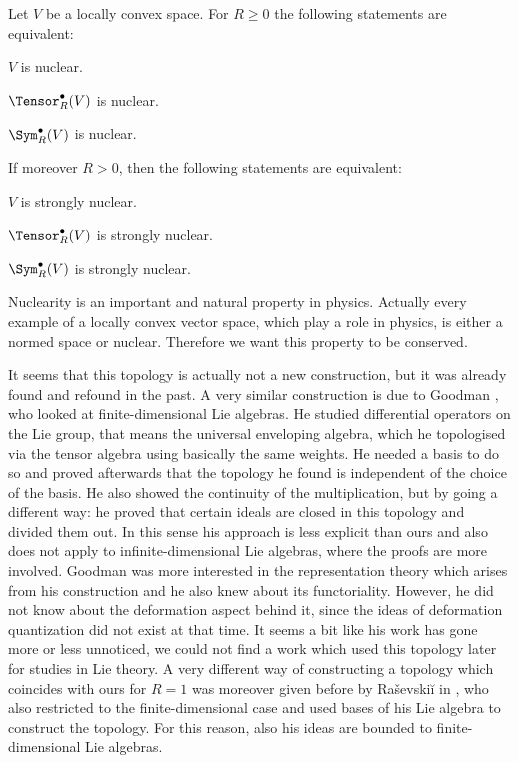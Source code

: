 \begin{proposition}[Nuclearity]
	\label{LCAna:Nuclearity}
	Let $V$ be a locally convex space. For $R \geq 0$ the following statements 
	are equivalent:
	\begin{propositionlist}
	  \item
		$V$ is nuclear.
	  \item
	  	$\Tensor_R^{\bullet}(V)$ is nuclear.
	  \item
	  	$\Sym_R^{\bullet}(V)$ is nuclear.	  	
	\end{propositionlist}
	If moreover $R > 0$, then the following statements are equivalent:
	\begin{propositionlist}
	  \item
		$V$ is strongly nuclear.
	  \item
	  	$\Tensor_R^{\bullet}(V)$ is strongly nuclear.
	  \item
	  	$\Sym_R^{\bullet}(V)$ is strongly nuclear.
	\end{propositionlist}
\end{proposition}
Nuclearity is an important and natural property in physics. Actually every 
example of a locally convex vector space, which play a role in physics, is 
either a normed space or nuclear. Therefore we want this property to be 
conserved.
\begin{remark}
	It seems that this topology is actually not a new construction, but it 
	was already found and refound in the past. A very similar construction is 
	due to Goodman \cite{goodman:1971a}, who looked at finite-dimensional 
	Lie algebras. He studied differential operators on the Lie group, that 
	means the universal enveloping algebra, which he topologised via the 
	tensor algebra using basically the same weights. He needed a basis to do so 
	and proved afterwards that the topology he found is independent of the 
	choice of the basis. He also showed the continuity of the multiplication, 
	but by going a different way: he proved that certain ideals are 
	closed in this topology and divided them out. In this sense his approach 
	is less explicit than ours and also does not apply to infinite-dimensional 
	Lie algebras, where the proofs are more involved. Goodman was more 
	interested in the representation theory which arises from his construction 
	and he also knew about its functoriality. However, he did not know 
	about the deformation aspect behind it, since the ideas of deformation 
	quantization did not exist at that time. It seems a bit like his work has 
	gone more or less unnoticed, we could not find a work which used this 
	topology later for studies in Lie theory. A very different way of 
	constructing a topology which coincides with ours for $R = 1$ was moreover 
	given before by Ra{\v{s}}evski{\u{i}} in \cite{rasevskii:1966a}, who also 
	restricted to the finite-dimensional case and used bases of his Lie algebra 
	to construct the topology. For this reason, also his ideas are bounded to 
	finite-dimensional Lie algebras.
\end{remark}



